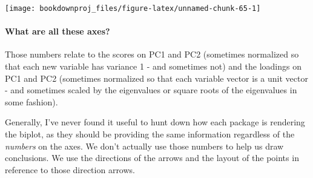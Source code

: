\documentclass[
]{article}
\newenvironment{Shaded}{\begin{snugshade}}{\end{snugshade}}
\newcommand{\AttributeTok}[1]{\textcolor[rgb]{0.77,0.63,0.00}{#1}}
\newcommand{\DecValTok}[1]{\textcolor[rgb]{0.00,0.00,0.81}{#1}}
\newcommand{\FloatTok}[1]{\textcolor[rgb]{0.00,0.00,0.81}{#1}}
\newcommand{\FunctionTok}[1]{\textcolor[rgb]{0.00,0.00,0.00}{#1}}
\newcommand{\NormalTok}[1]{#1}
\newcommand{\OtherTok}[1]{\textcolor[rgb]{0.56,0.35,0.01}{#1}}
\newcommand{\SpecialCharTok}[1]{\textcolor[rgb]{0.00,0.00,0.00}{#1}}
\newcommand{\StringTok}[1]{\textcolor[rgb]{0.31,0.60,0.02}{#1}}
\theoremstyle{definition}
\theoremstyle{definition}
\theoremstyle{definition}
\theoremstyle{definition}
\theoremstyle{remark}
\begin{document}
\begin{Shaded}
\end{Shaded}

\begin{center}\texttt{[image: bookdownproj\_files/figure-latex/unnamed-chunk-65-1]} \end{center}

\hypertarget{what-are-all-these-axes}{%
\paragraph{What are all these axes?}\label{what-are-all-these-axes}}

Those numbers relate to the scores on PC1 and PC2 (sometimes normalized so that each new variable has variance 1 - and sometimes not) and the loadings on PC1 and PC2 (sometimes normalized so that each variable vector is a unit vector - and sometimes scaled by the eigenvalues or square roots of the eigenvalues in some fashion).

Generally, I've never found it useful to hunt down how each package is rendering the biplot, as they should be providing the same information regardless of the \emph{numbers} on the axes. We don't actually use those numbers to help us draw conclusions. We use the directions of the arrows and the layout of the points in reference to those direction arrows.
\end{document}
